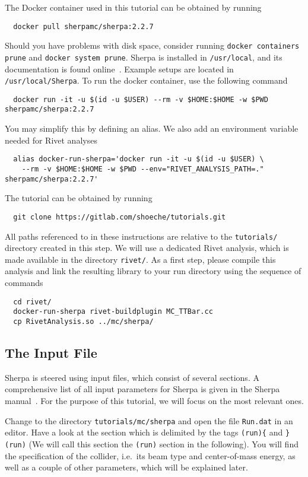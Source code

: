 \documentclass[10pt]{article}
\begin{document}
The Docker container used in this tutorial can be obtained by running
\begin{verbatim}
  docker pull sherpamc/sherpa:2.2.7
\end{verbatim}
Should you have problems with disk space, consider running
{\tt docker containers prune} and {\tt docker system prune}.
Sherpa is installed in {\tt /usr/local}, and its documentation is found
online~\cite{SherpaManual}. Example setups are located in {\tt /usr/local/Sherpa}.
To run the docker container, use the following command
\begin{verbatim}
  docker run -it -u $(id -u $USER) --rm -v $HOME:$HOME -w $PWD sherpamc/sherpa:2.2.7
\end{verbatim}
You may simplify this by defining an alias. We also add an environment variable
needed for Rivet analyses
\begin{verbatim}
  alias docker-run-sherpa='docker run -it -u $(id -u $USER) \
    --rm -v $HOME:$HOME -w $PWD --env="RIVET_ANALYSIS_PATH=." sherpamc/sherpa:2.2.7'
\end{verbatim}
The tutorial can be obtained by running
\begin{verbatim}
  git clone https://gitlab.com/shoeche/tutorials.git
\end{verbatim}
All paths referenced to in these instructions are relative to the {\tt tutorials/}
directory created in this step. We will use a dedicated Rivet analysis, which is made
available in the directory {\tt rivet/}. As a first step, please compile this analysis
and link the resulting library to your run directory using the sequence of commands
\begin{verbatim}
  cd rivet/
  docker-run-sherpa rivet-buildplugin MC_TTBar.cc
  cp RivetAnalysis.so ../mc/sherpa/
\end{verbatim}


\subsection{The Input File}

Sherpa is steered using input files, which consist of several sections.
A comprehensive list of all input parameters for Sherpa is given in the
Sherpa manual~\cite{SherpaManual}. For the purpose of this tutorial, 
we will focus on the most relevant ones.

Change to the directory {\tt tutorials/mc/sherpa} and open the file {\tt Run.dat}
in an editor. Have a look at the section which is delimited by the tags {\tt(run)\{}
and {\tt \}(run)} (We will call this section the {\tt(run)} section in the following). 
You will find the specification of the collider, i.e.\ its beam type and center-of-mass 
energy, as well as a couple of other parameters, which will be explained later.
\end{document}
